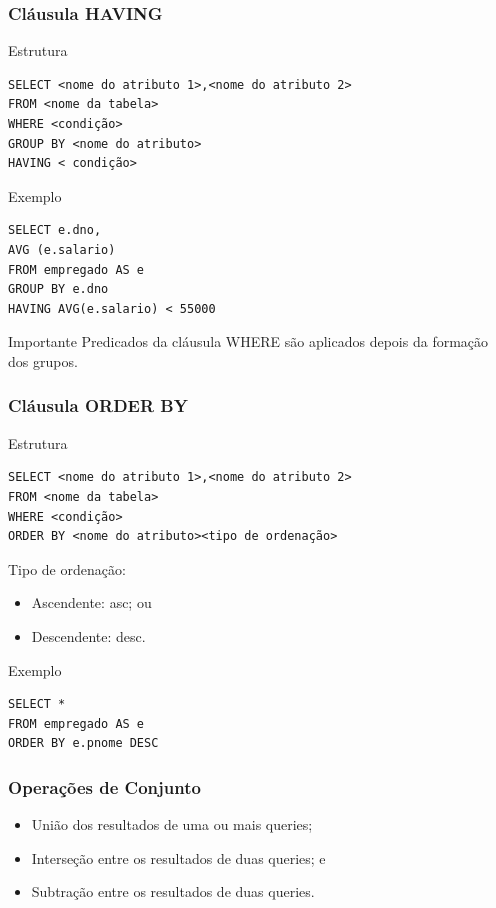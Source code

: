 \documentclass{beamer}
\begin{document}
\begin{frame}[fragile]
\frametitle{Cláusula HAVING}

\begin{block}{Estrutura}
	\begin{lstlisting}
SELECT <nome do atributo 1>,<nome do atributo 2>
FROM <nome da tabela>
WHERE <condição>
GROUP BY <nome do atributo>
HAVING < condição>
	\end{lstlisting}
\end{block}\vfill

\begin{exampleblock}{Exemplo}
	\begin{lstlisting}
SELECT e.dno,
AVG (e.salario)
FROM empregado AS e
GROUP BY e.dno
HAVING AVG(e.salario) < 55000
	\end{lstlisting}
\end{exampleblock}\vfill

\begin{alertblock}{Importante}
Predicados da cláusula WHERE são aplicados depois da formação dos
grupos.
\end{alertblock}
\end{frame}

\begin{frame}[fragile]
\frametitle{Cláusula ORDER BY}

\begin{block}{Estrutura}
	\begin{lstlisting}
SELECT <nome do atributo 1>,<nome do atributo 2>
FROM <nome da tabela>
WHERE <condição>
ORDER BY <nome do atributo><tipo de ordenação>
	\end{lstlisting}
\end{block}\vfill

Tipo de ordenação:
\begin{itemize}
	\item Ascendente: asc; ou
	\item Descendente: desc.
\end{itemize}\vfill

\begin{exampleblock}{Exemplo}
	\begin{lstlisting}
SELECT *
FROM empregado AS e
ORDER BY e.pnome DESC
	\end{lstlisting}
\end{exampleblock}
\end{frame}

\begin{frame}[fragile]
\frametitle{Operações de Conjunto}

\begin{itemize}
	\item União dos resultados de uma ou mais queries;
	\item Interseção entre os resultados de duas queries; e
	\item Subtração entre os resultados de duas queries.
\end{itemize}
\end{frame}
\end{document}
